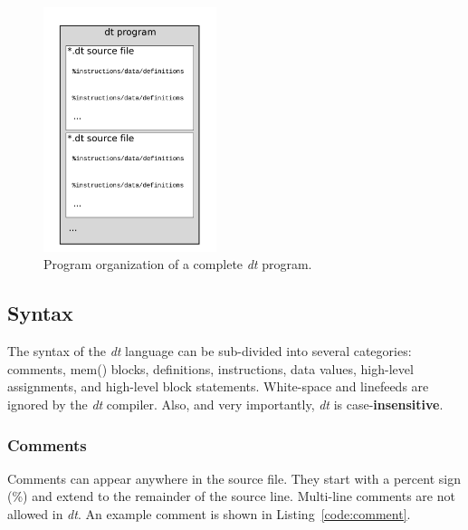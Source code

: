 \begin{figure}
\centering
\includegraphics[width=0.45\textwidth]{figs/dt-program.pdf}
\caption{Program organization of a complete \emph{dt} program.}
\label{pic:program}
\vspace{-1em}
\end{figure}



\subsection{Syntax}

The syntax of the \emph{dt} language can be sub-divided into
several categories: comments, mem() blocks, definitions, instructions, 
data values, high-level assignments, and high-level block statements.
White-space and linefeeds are ignored by the \emph{dt} 
compiler. Also, and very importantly, \emph{dt} is case-\textbf{insensitive}.

\subsubsection{Comments}

Comments can appear anywhere in the source file.  They start 
with a percent sign (\%) and extend to the remainder of the source line.
Multi-line comments are not allowed in \emph{dt}.  An example comment 
is shown in Listing~\ref{code:comment}.

\begin{lstlisting}[label=code:comment,caption=Code example of a comment,basicstyle=\footnotesize,numbers=left,numberstyle=\tiny,stepnumber=1, numbersep=6pt,frame=single,captionpos=b,escapechar=@]
% This is a comment.
\end{lstlisting}

